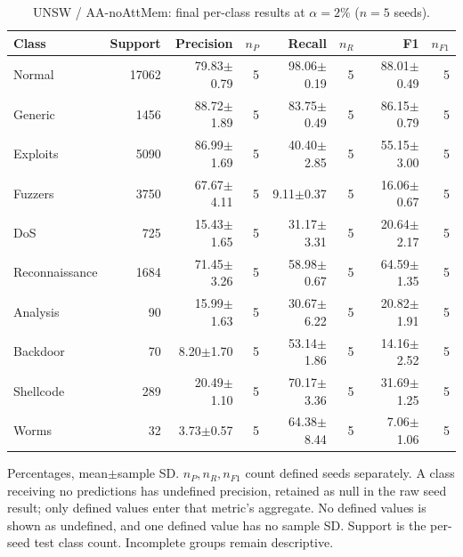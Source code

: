 \begin{table}[t]
\centering\scriptsize
\setlength{\tabcolsep}{3.3pt}
\caption{UNSW / AA-noAttMem: final per-class results at $\alpha=2\%$ ($n=5$ seeds).}\label{tab:forgetting-class-unsw_nb15-aa-noattmem}
\begin{tabular}{lrrrrrrr}
\toprule
Class & Support & Precision & $n_P$ & Recall & $n_R$ & F1 & $n_{F1}$ \\
\midrule
Normal & 17062 & 79.83$\pm$0.79 & 5 & 98.06$\pm$0.19 & 5 & 88.01$\pm$0.49 & 5 \\
Generic & 1456 & 88.72$\pm$1.89 & 5 & 83.75$\pm$0.49 & 5 & 86.15$\pm$0.79 & 5 \\
Exploits & 5090 & 86.99$\pm$1.69 & 5 & 40.40$\pm$2.85 & 5 & 55.15$\pm$3.00 & 5 \\
Fuzzers & 3750 & 67.67$\pm$4.11 & 5 & 9.11$\pm$0.37 & 5 & 16.06$\pm$0.67 & 5 \\
DoS & 725 & 15.43$\pm$1.65 & 5 & 31.17$\pm$3.31 & 5 & 20.64$\pm$2.17 & 5 \\
Reconnaissance & 1684 & 71.45$\pm$3.26 & 5 & 58.98$\pm$0.67 & 5 & 64.59$\pm$1.35 & 5 \\
Analysis & 90 & 15.99$\pm$1.63 & 5 & 30.67$\pm$6.22 & 5 & 20.82$\pm$1.91 & 5 \\
Backdoor & 70 & 8.20$\pm$1.70 & 5 & 53.14$\pm$1.86 & 5 & 14.16$\pm$2.52 & 5 \\
Shellcode & 289 & 20.49$\pm$1.10 & 5 & 70.17$\pm$3.36 & 5 & 31.69$\pm$1.25 & 5 \\
Worms & 32 & 3.73$\pm$0.57 & 5 & 64.38$\pm$8.44 & 5 & 7.06$\pm$1.06 & 5 \\
\bottomrule
\end{tabular}
\par\smallskip\begin{minipage}{0.98\textwidth}\scriptsize Percentages, mean$\pm$sample SD. $n_P,n_R,n_{F1}$ count defined seeds separately. A class receiving no predictions has undefined precision, retained as null in the raw seed result; only defined values enter that metric's aggregate. No defined values is shown as undefined, and one defined value has no sample SD. Support is the per-seed test class count. Incomplete groups remain descriptive.\end{minipage}
\end{table}

